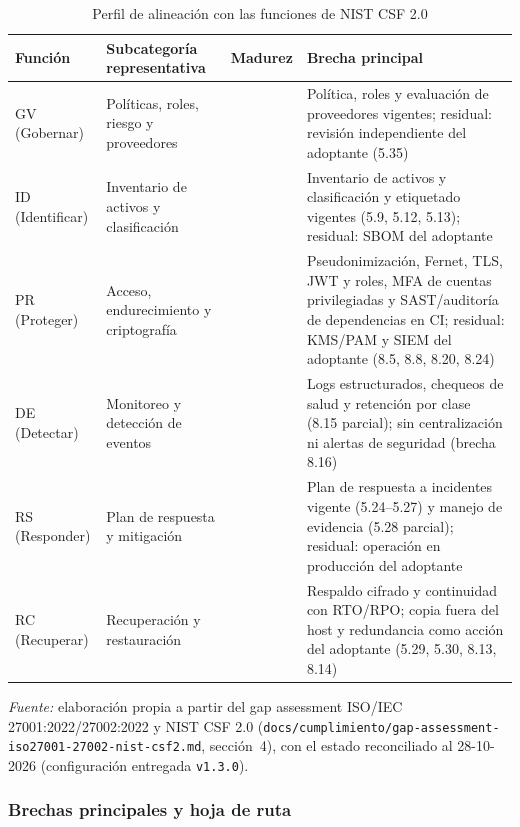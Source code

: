 \begin{table}[htbp]
\centering
\caption{Perfil de alineación con las funciones de NIST CSF 2.0}
\label{tab:cumplimiento-nist}
\footnotesize\singlespacing
\setlength{\tabcolsep}{4pt}
\begin{tabular}{@{}>{\raggedright\arraybackslash}p{2.2cm} >{\raggedright\arraybackslash}p{3.7cm} >{\centering\arraybackslash}p{1.2cm} >{\raggedright\arraybackslash}p{7.9cm}@{}}
\toprule
\textbf{Función} & \textbf{Subcategoría representativa} & \textbf{Madurez} & \textbf{Brecha principal} \\
\midrule
GV (Gobernar) & Políticas, roles, riesgo y proveedores & 2 & Política, roles y evaluación de proveedores vigentes; residual: revisión independiente del adoptante (5.35) \\
ID (Identificar) & Inventario de activos y clasificación & 2 & Inventario de activos y clasificación y etiquetado vigentes (5.9, 5.12, 5.13); residual: SBOM del adoptante \\
PR (Proteger) & Acceso, endurecimiento y criptografía & 3 & Pseudonimización, Fernet, TLS, JWT y roles, MFA de cuentas privilegiadas y SAST/auditoría de dependencias en CI; residual: KMS/PAM y SIEM del adoptante (8.5, 8.8, 8.20, 8.24) \\
DE (Detectar) & Monitoreo y detección de eventos & 1 & Logs estructurados, chequeos de salud y retención por clase (8.15 parcial); sin centralización ni alertas de seguridad (brecha 8.16) \\
RS (Responder) & Plan de respuesta y mitigación & 2 & Plan de respuesta a incidentes vigente (5.24--5.27) y manejo de evidencia (5.28 parcial); residual: operación en producción del adoptante \\
RC (Recuperar) & Recuperación y restauración & 2 & Respaldo cifrado y continuidad con RTO/RPO; copia fuera del host y redundancia como acción del adoptante (5.29, 5.30, 8.13, 8.14) \\
\bottomrule
\end{tabular}
\par
{\footnotesize\textit{Fuente:} elaboración propia a partir del gap assessment ISO/IEC 27001:2022/27002:2022 y NIST CSF 2.0 (\texttt{docs/cumplimiento/gap-assessment-iso27001-27002-nist-csf2.md}, sección~4), con el estado reconciliado al 28-10-2026 (configuración entregada \texttt{v1.3.0}).\par}
\end{table}

\subsubsection{Brechas principales y hoja de ruta}\label{subsec:cumplimiento-brechas}

